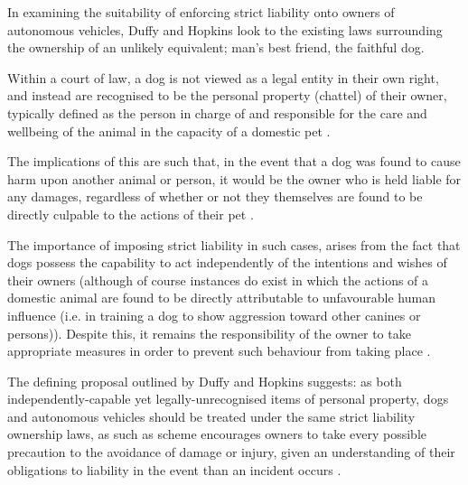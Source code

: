 \documentclass[conference]{IEEEtran}
\begin{document}

In examining the suitability of enforcing strict liability onto owners of autonomous vehicles, Duffy and Hopkins \cite{duffy} look to the existing laws surrounding the ownership of an unlikely equivalent; man's best friend, the faithful dog.



Within a court of law, a dog is not viewed as a legal entity in their own right,  and instead are recognised to be the personal property (chattel) of their owner, typically defined as the person in charge of and responsible for the care and wellbeing of the animal in the capacity of a domestic pet \cite{pet-law}.

The implications of this are such that, in the event that a dog was found to cause harm upon another animal or person, it would be the owner who is held liable for any damages, regardless of whether or not they themselves are found to be directly culpable to the actions of their pet \cite{duffy}. 

The importance of imposing strict liability in such cases, arises from the fact that dogs possess the capability to act independently of the intentions and wishes of their owners (although of course instances do exist in which the actions of a domestic animal are found to be directly attributable to unfavourable human influence (i.e. in training a dog to show aggression toward other canines or persons)). Despite this, it remains the responsibility of the owner to take appropriate measures in order to prevent such behaviour from taking place \cite{duffy}.


The defining proposal outlined by Duffy and Hopkins \cite{duffy} suggests: as both independently-capable yet legally-unrecognised items of personal property, dogs and autonomous vehicles should be treated under the same strict liability ownership laws, as such as scheme encourages owners to take every possible precaution to the avoidance of damage or injury, given an understanding of their obligations to liability in the event than an incident occurs \cite{duffy}. 
\end{document}
